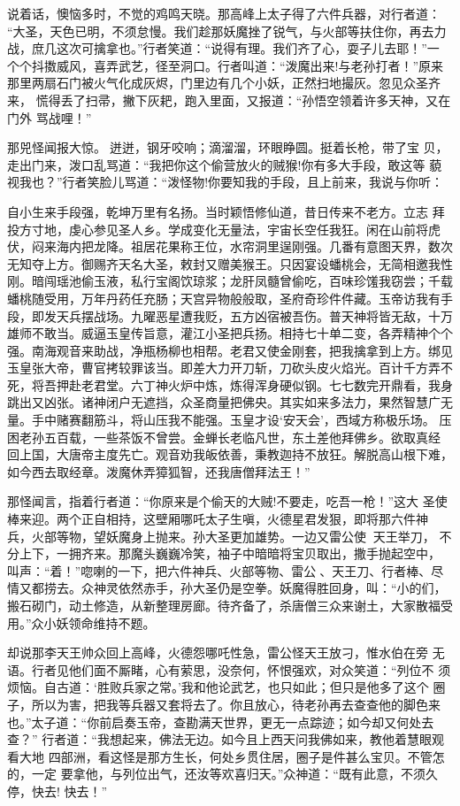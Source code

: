 说着话，懊恼多时，不觉的鸡鸣天晓。那高峰上太子得了六件兵器，对行者道：
“大圣，天色已明，不须怠慢。我们趁那妖魔挫了锐气，与火部等扶住你，再去力
战，庶几这次可擒拿也。”行者笑道：“说得有理。我们齐了心，耍子儿去耶！”一
个个抖擞威风，喜弄武艺，径至洞口。行者叫道：“泼魔出来!与老孙打者！”原来
那里两扇石门被火气化成灰烬，门里边有几个小妖，正然扫地撮灰。忽见众圣齐来，
慌得丢了扫帚，撇下灰耙，跑入里面，又报道：“孙悟空领着许多天神，又在门外
骂战哩！”

那兕怪闻报大惊。迸迸，钢牙咬响；滴溜溜，环眼睁圆。挺着长枪，带了宝
贝，走出门来，泼口乱骂道：“我把你这个偷营放火的贼猴!你有多大手段，敢这等
藐视我也？”行者笑脸儿骂道：“泼怪物!你要知我的手段，且上前来，我说与你听：

自小生来手段强，乾坤万里有名扬。当时颖悟修仙道，昔日传来不老方。立志
拜投方寸地，虔心参见圣人乡。学成变化无量法，宇宙长空任我狂。闲在山前将虎
伏，闷来海内把龙降。祖居花果称王位，水帘洞里逞刚强。几番有意图天界，数次
无知夺上方。御赐齐天名大圣，敕封又赠美猴王。只因宴设蟠桃会，无简相邀我性
刚。暗闯瑶池偷玉液，私行宝阁饮琼浆；龙肝凤髓曾偷吃，百味珍馐我窃尝；千载
蟠桃随受用，万年丹药任充肠；天宫异物般般取，圣府奇珍件件藏。玉帝访我有手
段，即发天兵摆战场。九曜恶星遭我贬，五方凶宿被吾伤。普天神将皆无敌，十万
雄师不敢当。威逼玉皇传旨意，灌江小圣把兵扬。相持七十单二变，各弄精神个个
强。南海观音来助战，净瓶杨柳也相帮。老君又使金刚套，把我擒拿到上方。绑见
玉皇张大帝，曹官拷较罪该当。即差大力开刀斩，刀砍头皮火焰光。百计千方弄不
死，将吾押赴老君堂。六丁神火炉中炼，炼得浑身硬似钢。七七数完开鼎看，我身
跳出又凶张。诸神闭户无遮挡，众圣商量把佛央。其实如来多法力，果然智慧广无
量。手中赌赛翻筋斗，将山压我不能强。玉皇才设‘安天会’，西域方称极乐场。
压困老孙五百载，一些茶饭不曾尝。金蝉长老临凡世，东土差他拜佛乡。欲取真经
回上国，大唐帝主度先亡。观音劝我皈依善，秉教迦持不放狂。解脱高山根下难，
如今西去取经章。泼魔休弄獐狐智，还我唐僧拜法王！”

那怪闻言，指着行者道：“你原来是个偷天的大贼!不要走，吃吾一枪！”这大
圣使棒来迎。两个正自相持，这壁厢哪吒太子生嗔，火德星君发狠，即将那六件神
兵，火部等物，望妖魔身上抛来。孙大圣更加雄势。一边又雷公使，天王举刀，
不分上下，一拥齐来。那魔头巍巍冷笑，袖子中暗暗将宝贝取出，撒手抛起空中，
叫声：“着！”唿喇的一下，把六件神兵、火部等物、雷公、天王刀、行者棒、尽
情又都捞去。众神灵依然赤手，孙大圣仍是空拳。妖魔得胜回身，叫：“小的们，
搬石砌门，动土修造，从新整理房廊。待齐备了，杀唐僧三众来谢土，大家散福受
用。”众小妖领命维持不题。

却说那李天王帅众回上高峰，火德怨哪吒性急，雷公怪天王放刁，惟水伯在旁
无语。行者见他们面不厮睹，心有萦思，没奈何，怀恨强欢，对众笑道：“列位不
须烦恼。自古道：‘胜败兵家之常。’我和他论武艺，也只如此；但只是他多了这个
圈子，所以为害，把我等兵器又套将去了。你且放心，待老孙再去查查他的脚色来
也。”太子道：“你前启奏玉帝，查勘满天世界，更无一点踪迹；如今却又何处去查？”
行者道：“我想起来，佛法无边。如今且上西天问我佛如来，教他着慧眼观看大地
四部洲，看这怪是那方生长，何处乡贯住居，圈子是件甚么宝贝。不管怎的，一定
要拿他，与列位出气，还汝等欢喜归天。”众神道：“既有此意，不须久停，快去!
快去！”

